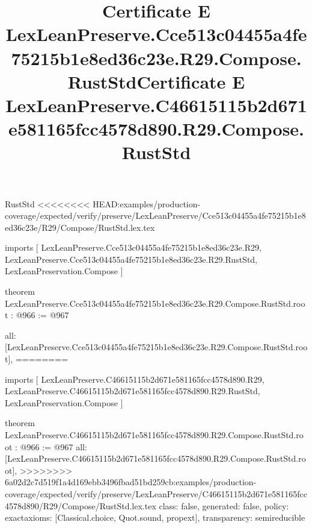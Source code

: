 \begin{lexlean}{RustStd}
<<<<<<<< HEAD:examples/production-coverage/expected/verify/preserve/LexLeanPreserve/Cce513c04455a4fe75215b1e8ed36c23e/R29/Compose/RustStd.lex.tex
\title{Certificate E LexLeanPreserve.Cce513c04455a4fe75215b1e8ed36c23e.R29.Compose.RustStd}
\begin{coremodule}
imports [
  LexLeanPreserve.Cce513c04455a4fe75215b1e8ed36c23e.R29,
  LexLeanPreserve.Cce513c04455a4fe75215b1e8ed36c23e.R29.RustStd,
  LexLeanPreservation.Compose
]

theorem LexLeanPreserve.Cce513c04455a4fe75215b1e8ed36c23e.R29.Compose.RustStd.root : @966 := @967 {
  all: [LexLeanPreserve.Cce513c04455a4fe75215b1e8ed36c23e.R29.Compose.RustStd.root],
========
\title{Certificate E LexLeanPreserve.C46615115b2d671e581165fcc4578d890.R29.Compose.RustStd}
\begin{coremodule}
imports [
  LexLeanPreserve.C46615115b2d671e581165fcc4578d890.R29,
  LexLeanPreserve.C46615115b2d671e581165fcc4578d890.R29.RustStd,
  LexLeanPreservation.Compose
]

theorem LexLeanPreserve.C46615115b2d671e581165fcc4578d890.R29.Compose.RustStd.root : @966 := @967 {
  all: [LexLeanPreserve.C46615115b2d671e581165fcc4578d890.R29.Compose.RustStd.root],
>>>>>>>> 6a02d2c7d519f1a4d169ebb3496fbad51bd259cb:examples/production-coverage/expected/verify/preserve/LexLeanPreserve/C46615115b2d671e581165fcc4578d890/R29/Compose/RustStd.lex.tex
  class: false,
  generated: false,
  policy: exact{axioms: [Classical.choice, Quot.sound, propext]},
  transparency: semireducible
}


\end{coremodule}}
\end{coremodule}
\end{lexlean}
